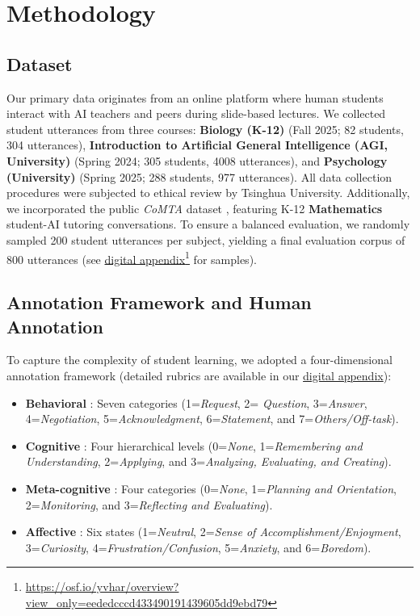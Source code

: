 \documentclass[runningheads]{llncs}
\begin{document}
\section{Methodology}
\subsection{Dataset}
Our primary data originates from an online platform where human students interact with AI teachers and peers during slide-based lectures. We collected student utterances from three courses: \textbf{Biology (K-12)} (Fall 2025; 82 students, 304 utterances), \textbf{Introduction to Artificial General Intelligence (AGI, University)} (Spring 2024; 305 students, 4008 utterances), and \textbf{Psychology (University)} (Spring 2025; 288 students, 977 utterances). All data collection procedures were subjected to ethical review by Tsinghua University. Additionally, we incorporated the public \textit{CoMTA} dataset \cite{miller2024llm}, featuring K-12 \textbf{Mathematics} student-AI tutoring conversations. To ensure a balanced evaluation, we randomly sampled 200 student utterances per subject, yielding a final evaluation corpus of 800 utterances (see \href{https://osf.io/yvhar/overview?view_only=eededcccd433490191439605dd9ebd79}{digital appendix}\footnote{\url{https://osf.io/yvhar/overview?view_only=eededcccd433490191439605dd9ebd79}} for samples).

\subsection{Annotation Framework and Human Annotation}
To capture the complexity of student learning, we adopted a four-dimensional annotation framework (detailed rubrics are available in our \href{https://osf.io/yvhar/overview?view_only=eededcccd433490191439605dd9ebd79}{digital appendix}):
\begin{itemize}
    \item \textbf{Behavioral} \cite{han2024recipe4u,hao_mapping_2026}: Seven categories (1=\textit{Request}, 2= \textit{Question}, 3=\textit{Answer}, 4=\textit{Negotiation}, 5=\textit{Acknowledgment}, 6=\textit{Statement}, and 7=\textit{Others/Off-task}).
    \item \textbf{Cognitive} \cite{bloom1956taxonomy}: Four hierarchical levels (0=\textit{None}, 1=\textit{Remembering and Understanding}, 2=\textit{Applying}, and 3=\textit{Analyzing, Evaluating, and Creating}).
    \item \textbf{Meta-cognitive} \cite{zimmerman2002becoming}: Four categories (0=\textit{None}, 1=\textit{Planning and Orientation}, 2=\textit{Monitoring}, and 3=\textit{Reflecting and Evaluating}).
    \item \textbf{Affective} \cite{liu2025engagement}: Six states (1=\textit{Neutral}, 2=\textit{Sense of Accomplishment/Enjoyment}, 3=\textit{Curiosity}, 4=\textit{Frustration/Confusion}, 5=\textit{Anxiety}, and 6=\textit{Boredom}).
\end{itemize}
\end{document}
